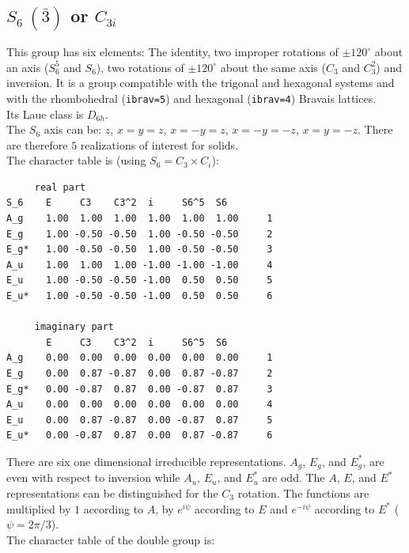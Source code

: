 \documentclass[12pt,a4paper]{article}
\begin{document}
\subsection{\color{web-blue}$S_6\ (\bar 3)$ or $C_{3i}$}  
This group has six elements: The identity, two improper rotations 
of $\pm120^\circ$ about an axis ($S_6^5$ and $S_6$), two rotations of 
$\pm120^\circ$ about the same axis ($C_3$ and $C_3^2$) and inversion.
It is a group compatible with the trigonal and hexagonal systems and with the  
rhombohedral (\texttt{ibrav=5}) and hexagonal (\texttt{ibrav=4}) Bravais lattices. \\
Its Laue class is $D_{6h}$. \\
The $S_6$ axis can be: $z$, $x=y=z$, $x=-y=z$, 
$x=-y=-z$, $x=y=-z$.
There are therefore $5$ realizations of interest for solids. \\
The character table is (using $S_6=C_3 \times C_i$):
\begin{verbatim}
     real part
S_6    E     C3    C3^2  i     S6^5  S6   
A_g    1.00  1.00  1.00  1.00  1.00  1.00     1
E_g    1.00 -0.50 -0.50  1.00 -0.50 -0.50     2
E_g*   1.00 -0.50 -0.50  1.00 -0.50 -0.50     3
A_u    1.00  1.00  1.00 -1.00 -1.00 -1.00     4
E_u    1.00 -0.50 -0.50 -1.00  0.50  0.50     5
E_u*   1.00 -0.50 -0.50 -1.00  0.50  0.50     6

     imaginary part
       E     C3    C3^2  i     S6^5  S6   
A_g    0.00  0.00  0.00  0.00  0.00  0.00     1
E_g    0.00  0.87 -0.87  0.00  0.87 -0.87     2
E_g*   0.00 -0.87  0.87  0.00 -0.87  0.87     3
A_u    0.00  0.00  0.00  0.00  0.00  0.00     4
E_u    0.00  0.87 -0.87  0.00 -0.87  0.87     5
E_u*   0.00 -0.87  0.87  0.00  0.87 -0.87     6
\end{verbatim}
There are six one dimensional irreducible representations. $A_g$, $E_g$,
and $E_g^*$, are even with respect to inversion while $A_u$, $E_u$, and $E_u^*$
are odd. The $A$, $E$, and $E^*$ representations can be distinguished 
for the $C_3$ rotation. The functions are multiplied by $1$ according to $A$,
by $e^{i\psi}$ according to $E$ and $e^{-i\psi}$ according to $E^*$
($\psi=2\pi/3$). \\
The character table of the double group is:
\end{document}
